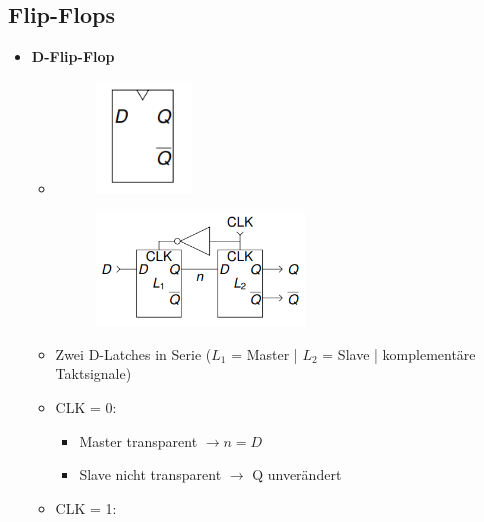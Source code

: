 \documentclass[11pt,a4paper]{article}
\begin{document}
\subsection{Flip-Flops}
\begin{itemize}

\item \textbf{D-Flip-Flop}
	\begin{itemize}
	\item[]		
				\begin{minipage}{0.25\textwidth}
					\begin{figure}[H]
					\includegraphics[height=3cm]{Bilder/dflipflop1}
					\end{figure}
				\end{minipage}
				\begin{minipage}[t]{0.6\textwidth}
					\vspace{-2.25cm}
					\begin{figure}[H]
					\includegraphics[height=3cm]{Bilder/dflipflop2}
					\end{figure}
				\end{minipage}
	\end{itemize}
	\begin{itemize}
	\item Zwei D-Latches in Serie ($L_1$ = Master | $L_2$ = Slave | komplementäre Taktsignale)
 	\item CLK = 0:
 		\vspace{-0.3cm}
 		\begin{itemize}
 		\item Master transparent $\rightarrow n = D$
 		\item Slave nicht transparent $\rightarrow$ Q unverändert
 		\end{itemize}
 	\item CLK = 1:
 		\vspace{-0.3cm}
 		\begin{itemize}

\end{itemize}
\end{itemize}
\end{itemize}
\end{document}
